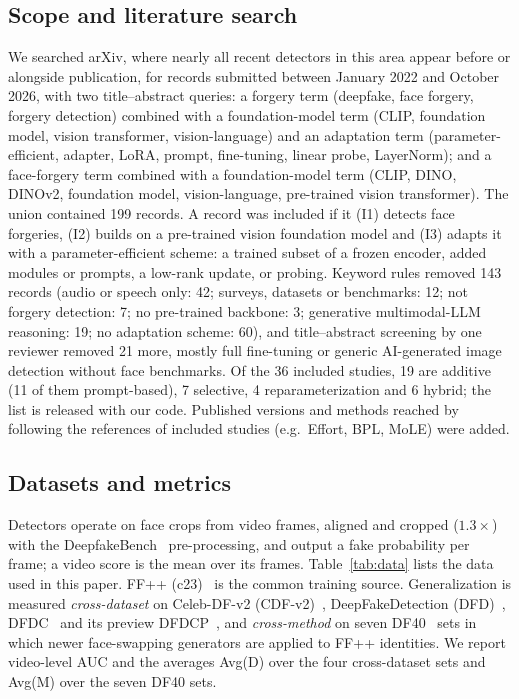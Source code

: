 \documentclass[fonts]{icst}
\begin{document}
\subsection{Scope and literature search}
\label{sec:search}
We searched arXiv, where nearly all recent detectors in this area appear before or alongside publication, for records submitted between January 2022 and October 2026, with two title--abstract queries: a forgery term (deepfake, face forgery, forgery detection) combined with a foundation-model term (CLIP, foundation model, vision transformer, vision-language) and an adaptation term (parameter-efficient, adapter, LoRA, prompt, fine-tuning, linear probe, LayerNorm); and a face-forgery term combined with a foundation-model term (CLIP, DINO, DINOv2, foundation model, vision-language, pre-trained vision transformer). The union contained 199 records. A record was included if it (I1) detects face forgeries, (I2) builds on a pre-trained vision foundation model and (I3) adapts it with a parameter-efficient scheme: a trained subset of a frozen encoder, added modules or prompts, a low-rank update, or probing. Keyword rules removed 143 records (audio or speech only: 42; surveys, datasets or benchmarks: 12; not forgery detection: 7; no pre-trained backbone: 3; generative multimodal-LLM reasoning: 19; no adaptation scheme: 60), and title--abstract screening by one reviewer removed 21 more, mostly full fine-tuning or generic AI-generated image detection without face benchmarks. Of the 36 included studies, 19 are additive (11 of them prompt-based), 7 selective, 4 reparameterization and 6 hybrid; the list is released with our code. Published versions and methods reached by following the references of included studies (e.g.\ Effort, BPL, MoLE) were added.

\subsection{Datasets and metrics}
Detectors operate on face crops from video frames, aligned and cropped ($1.3\times$) with the DeepfakeBench~\cite{yan2023deepfakebench} pre-processing, and output a fake probability per frame; a video score is the mean over its frames. Table~\ref{tab:data} lists the data used in this paper. FF++ (c23)~\cite{rossler2019ff} is the common training source. Generalization is measured \emph{cross-dataset} on Celeb-DF-v2 (CDF-v2)~\cite{li2020celeb}, DeepFakeDetection (DFD)~\cite{dufour2019dfd}, DFDC~\cite{dolhansky2020dfdc} and its preview DFDCP~\cite{dolhansky2019dfdcp}, and \emph{cross-method} on seven DF40~\cite{yan2024df40} sets in which newer face-swapping generators are applied to FF++ identities. We report video-level AUC and the averages Avg(D) over the four cross-dataset sets and Avg(M) over the seven DF40 sets.
\end{document}
